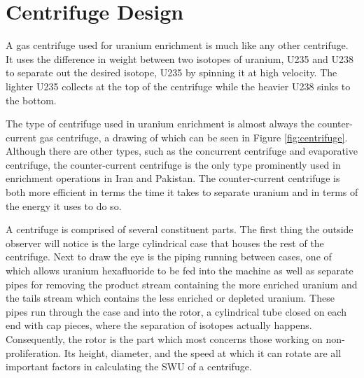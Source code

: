 \section{Centrifuge Design}
\label{s_centrifuge}
A gas centrifuge used for uranium enrichment is much like any other centrifuge. It uses the difference in weight between two isotopes of uranium, \gls{U235} and \gls{U238} to separate out the desired isotope, \gls{U235} by spinning it at high velocity. The lighter \gls{U235} collects at the top of the centrifuge while the heavier \gls{U238} sinks to the bottom.

\iffalse
\begin{figure}%
\texttt{[image: ./figs/centrifuge.png]}
\caption{A Nuclear Regulatory Commission Diagram of a Simple Gas Centrifuge}
\label{fig:centrifuge}
\end{figure}
\fi

The type of centrifuge used in uranium enrichment is almost always the counter-current gas centrifuge, a drawing of which can be seen in Figure \ref{fig:centrifuge}. Although there are other types, such as the concurrent centrifuge and evaporative centrifuge, the counter-current centrifuge is the only type prominently used in enrichment operations in Iran and Pakistan. The counter-current centrifuge is both more efficient in terms the time it takes to separate uranium and in terms of the energy it uses to do so.

A centrifuge is comprised of several constituent parts. The first thing the outside observer will notice is the large cylindrical case that houses the rest of the centrifuge. Next to draw the eye is the piping running between cases, one of which allows uranium hexafluoride to be fed into the machine as well as separate pipes for removing the product stream containing the more enriched uranium and the tails stream which contains the less enriched or depleted uranium. These pipes run through the case and into the rotor, a cylindrical tube closed on each end with cap pieces, where the separation of isotopes actually happens. Consequently, the rotor is the part which most concerns those working on non-proliferation. Its height, diameter, and the speed at which it can rotate are all important factors in calculating the \gls{SWU} of a centrifuge. 

